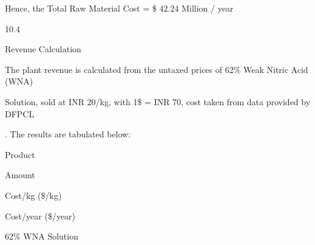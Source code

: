 \documentclass[a4paper,portrait,12pt]{article}
\begin{document}
\begin{flushleft}
Hence, the Total Raw Material Cost = \$ 42.24 Million / year
\end{flushleft}





10.4





\begin{flushleft}
Revenue Calculation
\end{flushleft}





\begin{flushleft}
The plant revenue is calculated from the untaxed prices of 62\% Weak Nitric Acid (WNA)
\end{flushleft}


\begin{flushleft}
Solution, sold at INR 20/kg, with 1\$ = INR 70, cost taken from data provided by DFPCL
\end{flushleft}


\begin{flushleft}
[7]. The results are tabulated below:
\end{flushleft}


\begin{flushleft}
Product
\end{flushleft}





\begin{flushleft}
Amount
\end{flushleft}





\begin{flushleft}
Cost/kg (\$/kg)
\end{flushleft}





\begin{flushleft}
Cost/year (\$/year)
\end{flushleft}





\begin{flushleft}
62\% WNA Solution
\end{flushleft}
\end{document}
